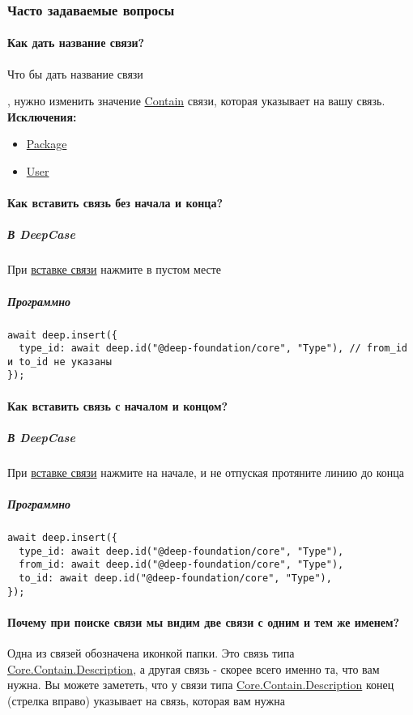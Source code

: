 \subsubsection{Часто задаваемые вопросы}
\paragraph{Как дать название связи?}
\hypertarget{FAQ.HowToSetName}{Что бы дать название связи}, нужно изменить
значение \hyperlink{Core.Contain.Description}{Contain} связи, которая указывает
на вашу
связь. \\
\textbf{Исключения:}
\begin{itemize}
      \item \hyperlink{Core.Package.Description}{Package}
      \item \hyperlink{Core.Package.Description}{User}
\end{itemize}
\paragraph{Как вставить связь без начала и
      конца?}\hypertarget{FAQ.HowToInsertLinkWithoutFromAndTo}{}
\subparagraph{В DeepCase}
При \hyperlink{DeepCase.InsertLink.Description}{вставке связи} нажмите в пустом
месте
\subparagraph{Программно}
\begin{verbatim}
await deep.insert({
  type_id: await deep.id("@deep-foundation/core", "Type"), // from_id и to_id не указаны
});
\end{verbatim}
\paragraph{Как вставить связь с началом и
      концом?}\hypertarget{FAQ.HowToInsertLinkWithFromAndTo}{}
\subparagraph{В DeepCase}
При \hyperlink{DeepCase.InsertLink.Description}{вставке связи} нажмите на
начале, и не отпуская протяните линию до конца
\subparagraph{Программно}
\begin{verbatim}
await deep.insert({
  type_id: await deep.id("@deep-foundation/core", "Type"),
  from_id: await deep.id("@deep-foundation/core", "Type"),
  to_id: await deep.id("@deep-foundation/core", "Type"),
});
\end{verbatim}
\paragraph{Почему при поиске связи мы видим две связи с одним и тем же именем?}
Одна из связей обозначена иконкой папки. Это связь типа \hyperlink{Contain}{Core.Contain.Description}, а другая связь - скорее всего именно та, что вам нужна. Вы можете замететь, что у связи типа \hyperlink{Contain}{Core.Contain.Description} конец (стрелка вправо) указывает на связь, которая вам нужна
